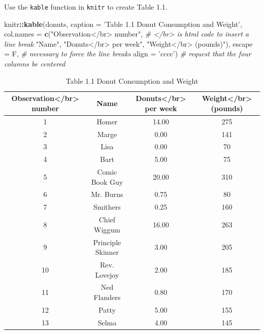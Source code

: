 \documentclass[]{book}
\newenvironment{Shaded}{\begin{snugshade}}{\end{snugshade}}
\newcommand{\CommentTok}[1]{\textcolor[rgb]{0.56,0.35,0.01}{\textit{#1}}}
\newcommand{\DataTypeTok}[1]{\textcolor[rgb]{0.13,0.29,0.53}{#1}}
\newcommand{\KeywordTok}[1]{\textcolor[rgb]{0.13,0.29,0.53}{\textbf{#1}}}
\newcommand{\NormalTok}[1]{#1}
\newcommand{\OperatorTok}[1]{\textcolor[rgb]{0.81,0.36,0.00}{\textbf{#1}}}
\newcommand{\StringTok}[1]{\textcolor[rgb]{0.31,0.60,0.02}{#1}}
\begin{document}
Use the \texttt{kable} function in \texttt{knitr} to create Table 1.1.

\begin{Shaded}
\begin{Highlighting}[]
\NormalTok{knitr}\OperatorTok{::}\KeywordTok{kable}\NormalTok{(donuts, }
             \DataTypeTok{caption =} \StringTok{'Table 1.1 Donut Consumption and Weight'}\NormalTok{, }
             \DataTypeTok{col.names =} \KeywordTok{c}\NormalTok{(}\StringTok{"Observation</br> number"}\NormalTok{, }\CommentTok{# </br> is html code to insert a line break}
                           \StringTok{"Name"}\NormalTok{, }\StringTok{"Donuts</br> per week"}\NormalTok{,}
                           \StringTok{"Weight</br> (pounds)"}\NormalTok{), }
             \DataTypeTok{escape =}\NormalTok{ F,  }\CommentTok{# necessary to force the line breaks}
             \DataTypeTok{align =} \StringTok{'cccc'}\NormalTok{) }\CommentTok{# request that the four columns be centered}
\end{Highlighting}
\end{Shaded}

\begin{table}

\caption{\label{tab:table}Table 1.1 Donut Consumption and Weight}
\centering
\begin{tabular}[t]{c|c|c|c}
\hline
Observation</br> number & Name & Donuts</br> per week & Weight</br> (pounds)\\
\hline
1 & Homer & 14.00 & 275\\
\hline
2 & Marge & 0.00 & 141\\
\hline
3 & Lisa & 0.00 & 70\\
\hline
4 & Bart & 5.00 & 75\\
\hline
5 & Comic Book Guy & 20.00 & 310\\
\hline
6 & Mr. Burns & 0.75 & 80\\
\hline
7 & Smithers & 0.25 & 160\\
\hline
8 & Chief Wiggum & 16.00 & 263\\
\hline
9 & Principle Skinner & 3.00 & 205\\
\hline
10 & Rev. Lovejoy & 2.00 & 185\\
\hline
11 & Ned Flanders & 0.80 & 170\\
\hline
12 & Patty & 5.00 & 155\\
\hline
13 & Selma & 4.00 & 145\\
\hline
\end{tabular}
\end{table}
\end{document}
